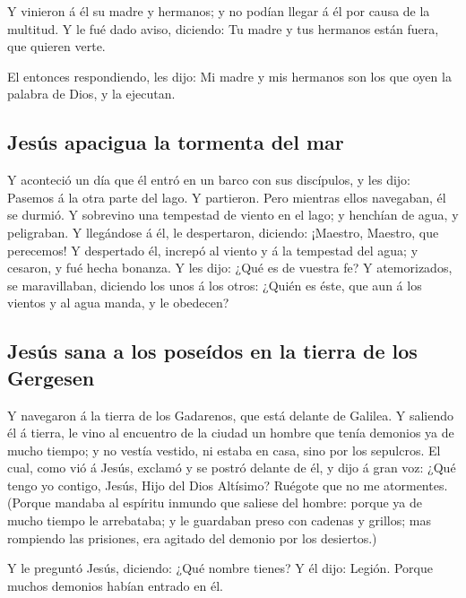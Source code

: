 Y vinieron á él su madre y hermanos; y no podían llegar á
él por causa de la multitud.  Y le fué dado aviso,
diciendo: Tu madre y tus hermanos están fuera, que quieren verte.

 El entonces respondiendo, les dijo: Mi madre y mis
hermanos son los que oyen la palabra de Dios, y la ejecutan.

\hypertarget{jesuxfas-apacigua-la-tormenta-del-mar}{%
\subsection{Jesús apacigua la tormenta del
mar}\label{jesuxfas-apacigua-la-tormenta-del-mar}}

 Y aconteció un día que él entró en un barco con sus
discípulos, y les dijo: Pasemos á la otra parte del lago. Y partieron.
 Pero mientras ellos navegaban, él se durmió. Y sobrevino
una tempestad de viento en el lago; y henchían de agua, y peligraban.
 Y llegándose á él, le despertaron, diciendo: ¡Maestro,
Maestro, que perecemos! Y despertado él, increpó al viento y á la
tempestad del agua; y cesaron, y fué hecha bonanza.  Y les
dijo: ¿Qué es de vuestra fe? Y atemorizados, se maravillaban, diciendo
los unos á los otros: ¿Quién es éste, que aun á los vientos y al agua
manda, y le obedecen?

\hypertarget{jesuxfas-sana-a-los-poseuxeddos-en-la-tierra-de-los-gergesen}{%
\subsection{Jesús sana a los poseídos en la tierra de los
Gergesen}\label{jesuxfas-sana-a-los-poseuxeddos-en-la-tierra-de-los-gergesen}}

 Y navegaron á la tierra de los Gadarenos, que está delante
de Galilea.  Y saliendo él á tierra, le vino al encuentro
de la ciudad un hombre que tenía demonios ya de mucho tiempo; y no
vestía vestido, ni estaba en casa, sino por los sepulcros. 
El cual, como vió á Jesús, exclamó y se postró delante de él, y dijo á
gran voz: ¿Qué tengo yo contigo, Jesús, Hijo del Dios Altísimo? Ruégote
que no me atormentes.  (Porque mandaba al espíritu inmundo
que saliese del hombre: porque ya de mucho tiempo le arrebataba; y le
guardaban preso con cadenas y grillos; mas rompiendo las prisiones, era
agitado del demonio por los desiertos.)

 Y le preguntó Jesús, diciendo: ¿Qué nombre tienes? Y él
dijo: Legión. Porque muchos demonios habían entrado en él.


